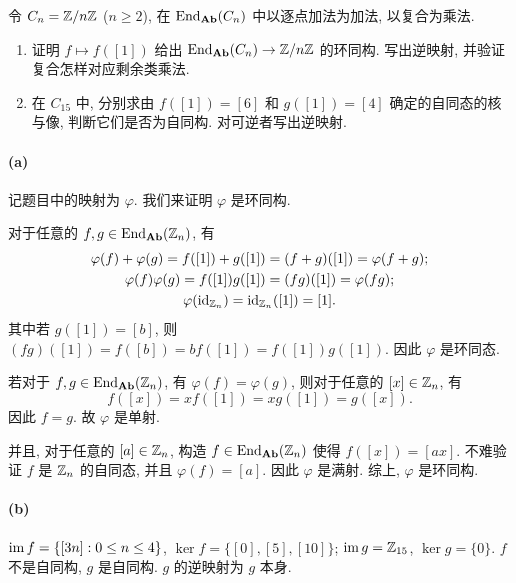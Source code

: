 \documentclass{article}
\begin{document}
\begin{problem}
令 $C_n=\mathbb{Z}/n\mathbb{Z}$ ($n\ge2$), 在 $\operatorname{End}_{\mathbf{Ab}}(C_n)$ 中以逐点加法为加法, 以复合为乘法.
\begin{enumerate}
  \item[(a)] 证明 $f\mapsto f([1])$ 给出 $\operatorname{End}_{\mathbf{Ab}}(C_n)\to\mathbb{Z}/n\mathbb{Z}$ 的环同构. 写出逆映射, 并验证复合怎样对应剩余类乘法.
  \item[(b)] 在 $C_{15}$ 中, 分别求由 $f([1])=[6]$ 和 $g([1])=[4]$ 确定的自同态的核与像, 判断它们是否为自同构. 对可逆者写出逆映射.
\end{enumerate}
\end{problem}

\begin{solution}
	\paragraph{(a)} 记题目中的映射为 $\varphi$. 我们来证明 $\varphi$ 是环同构. 

	对于任意的 $f, g \in \operatorname{End}_{\mathbf{Ab}}(\mathbb{Z}_n)$, 有
	\begin{gather*}
		\varphi(f) + \varphi(g) = f([1]) + g([1]) = (f+g)([1]) = \varphi(f + g); \\
		\varphi(f) \varphi(g) = f([1])g([1]) = (fg)([1]) = \varphi(fg); \\
		\varphi(\operatorname{id}_{\mathbb{Z}_n}) = \operatorname{id}_{\mathbb{Z}_n}([1]) = [1].
	\end{gather*}
	其中若 $g([1]) = [b]$, 则 $(fg)([1]) = f([b]) = bf([1]) = f([1])g([1])$.
	因此 $\varphi$ 是环同态.

	若对于 $f, g \in \operatorname{End}_{\mathbf{Ab}}(\mathbb{Z}_n)$, 有 $\varphi(f) = \varphi(g)$, 则对于任意的 $[x] \in \mathbb{Z}_n$, 有
	\[ f([x]) = x f([1]) = x g([1]) = g([x]). \]
	因此 $f = g$. 故 $\varphi$ 是单射. 

	并且, 对于任意的 $[a] \in \mathbb{Z}_n$, 构造 $f \in \operatorname{End}_{\mathbf{Ab}}(\mathbb{Z}_n)$ 使得 $f([x]) = [ax]$. 不难验证 $f$ 是 $\mathbb{Z}_n$ 的自同态, 并且 $\varphi(f) = [a]$. 因此 $\varphi$ 是满射. 综上, $\varphi$ 是环同构.

	\paragraph{(b)} $\operatorname{im} f = \{[3n]: 0 \le n \le 4\}$, $\ker f = \{[0], [5], [10]\}$; $\operatorname{im} g = \mathbb{Z}_{15}$, $\ker g = \{0\}$. $f$ 不是自同构, $g$ 是自同构. $g$ 的逆映射为 $g$ 本身.
\end{solution}
\end{document}
